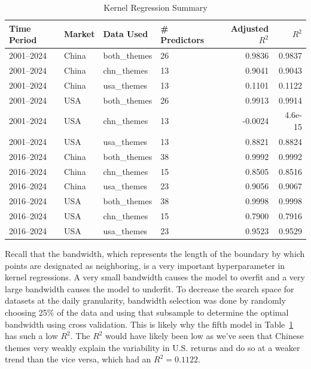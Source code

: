 \begin{table}[htbp]
\centering
\caption{Kernel Regression Summary}
\label{tab:kernel_regression_summary}
\begin{tabular}{@{}llllrr@{}}
\toprule
Time Period & Market & Data Used  & \# Predictors   & Adjusted $R^2$ & $R^2$ \\ \midrule
2001--2024    & China         & both\_themes & 26 & 0.9836         & 0.9837 \\
2001--2024    & China         & chn\_themes  & 13  & 0.9041         & 0.9043 \\
2001--2024    & China         & usa\_themes  & 13  & 0.1101         & 0.1122 \\
2001--2024  & USA           & both\_themes  & 26 & 0.9913         & 0.9914 \\
2001--2024   & USA           & chn\_themes  & 13  & -0.0024        & 4.6e-15 \\
2001--2024    & USA           & usa\_themes  & 13  & 0.8821         & 0.8824 \\
2016--2024    & China         & both\_themes & 38  & 0.9992         & 0.9992 \\
2016--2024    & China         & chn\_themes  & 15  & 0.8505         & 0.8516 \\
2016--2024   & China         & usa\_themes  & 23  & 0.9056         & 0.9067 \\
2016--2024    & USA           & both\_themes & 38  & 0.9998         & 0.9998 \\
2016--2024     & USA           & chn\_themes  & 15  & 0.7900         & 0.7916 \\
2016--2024    & USA           & usa\_themes   & 23 & 0.9523         & 0.9529 \\ \bottomrule
\end{tabular}
\end{table}

Recall that the bandwidth, which represents the length of the boundary by which points are designated as neighboring, is a very important hyperparameter in kernel regressions. A very small bandwidth causes the model to overfit and a very large bandwidth causes the model to underfit. To decrease the search space for datasets at the daily granularity, bandwidth selection was done by randomly choosing 25\% of the data and using that subsample to determine the optimal bandwidth using cross validation. This is likely why the fifth model in Table~\ref{tab:kernel_regression_summary} has such a low $R^2$. The $R^2$ would have likely been low as we've seen that Chinese themes very weakly explain the variability in U.S. returns and do so at a weaker trend than the vice versa, which had an $R^2=0.1122$.

